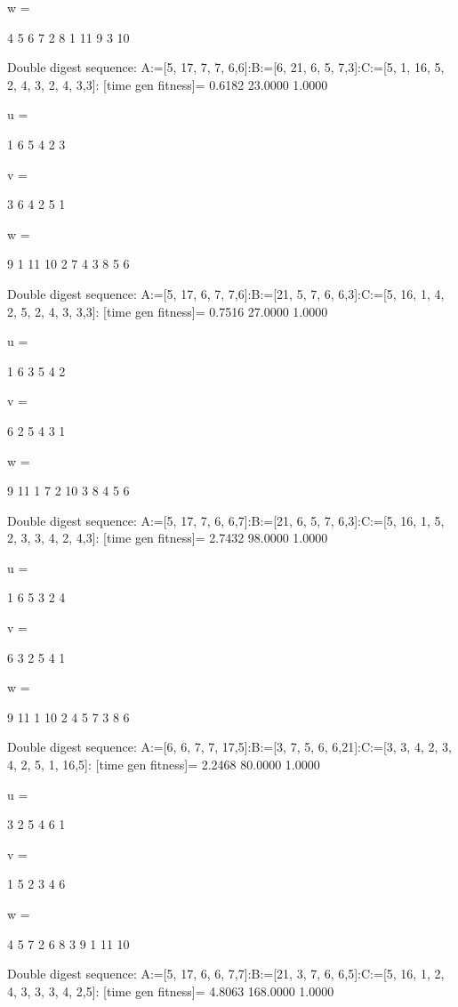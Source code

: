 w =

     4     5     6     7     2     8     1    11     9     3    10

Double digest sequence:
A:=[5, 17, 7, 7, 6,6]:B:=[6, 21, 6, 5, 7,3]:C:=[5, 1, 16, 5, 2, 4, 3, 2, 4, 3,3]:
[time gen fitness]=
    0.6182   23.0000    1.0000


u =

     1     6     5     4     2     3


v =

     3     6     4     2     5     1


w =

     9     1    11    10     2     7     4     3     8     5     6

Double digest sequence:
A:=[5, 17, 6, 7, 7,6]:B:=[21, 5, 7, 6, 6,3]:C:=[5, 16, 1, 4, 2, 5, 2, 4, 3, 3,3]:
[time gen fitness]=
    0.7516   27.0000    1.0000


u =

     1     6     3     5     4     2


v =

     6     2     5     4     3     1


w =

     9    11     1     7     2    10     3     8     4     5     6

Double digest sequence:
A:=[5, 17, 7, 6, 6,7]:B:=[21, 6, 5, 7, 6,3]:C:=[5, 16, 1, 5, 2, 3, 3, 4, 2, 4,3]:
[time gen fitness]=
    2.7432   98.0000    1.0000


u =

     1     6     5     3     2     4


v =

     6     3     2     5     4     1


w =

     9    11     1    10     2     4     5     7     3     8     6

Double digest sequence:
A:=[6, 6, 7, 7, 17,5]:B:=[3, 7, 5, 6, 6,21]:C:=[3, 3, 4, 2, 3, 4, 2, 5, 1, 16,5]:
[time gen fitness]=
    2.2468   80.0000    1.0000


u =

     3     2     5     4     6     1


v =

     1     5     2     3     4     6


w =

     4     5     7     2     6     8     3     9     1    11    10

Double digest sequence:
A:=[5, 17, 6, 6, 7,7]:B:=[21, 3, 7, 6, 6,5]:C:=[5, 16, 1, 2, 4, 3, 3, 3, 4, 2,5]:
[time gen fitness]=
    4.8063  168.0000    1.0000


